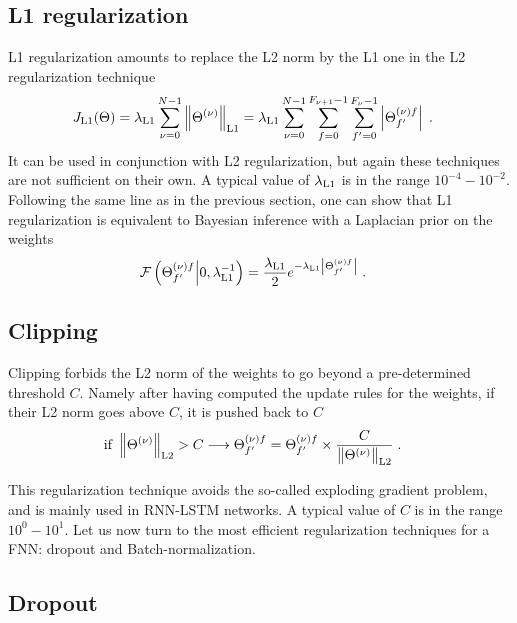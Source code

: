 \subsection{L1 regularization}

L1 regularization amounts to replace the L2 norm by the L1 one in the L2 regularization technique
\begin{align}
J_{{\rm L1}}(\Theta)&=\lambda_{{\rm L1}} \sum_{\nu=0}^{N-1}\left\|\Theta^{(\nu)}\right\|_{{\rm L1}}
%
=\lambda_{{\rm L1}}\sum_{\nu=0}^{N-1}\sum_{f=0}^{F_{\nu+1}-1}\sum_{f'=0}^{F_\nu-1}
%
\left|\Theta^{(\nu)f}_{f'}\right|\;.
\end{align}
It can be used in conjunction with L2 regularization, but again these techniques are not sufficient on their own. A typical value of $\lambda_{{\rm L1}}$ is in the range $10^{-4}-10^{-2}$. Following the same line as in the previous section, one can show that L1 regularization is equivalent to Bayesian inference with a Laplacian prior on the weights
\begin{align}
\mathcal{F}\left(\Theta^{(\nu)f}_{f'}\middle| 0,\lambda_{{\rm L1}}^{-1}\right)&=
%
\frac{\lambda_{{\rm L1}}}{2}e^{-\lambda_{{\rm L1}}\left|\Theta^{(\nu)f}_{f'}\right|}\;.
\end{align}

\subsection{Clipping}

Clipping forbids the L2 norm of the weights to go beyond a pre-determined threshold $C$. Namely after having computed the update rules for the weights, if their L2 norm goes above $C$, it is pushed back to $C$
\begin{align}
{\rm if}\;\left\|\Theta^{(\nu)}\right\|_{{\rm L2}}>C \longrightarrow \Theta^{(\nu)f}_{f'}&=
%
\Theta^{(\nu)f}_{f'} \times \frac{C}{\left\|\Theta^{(\nu)}\right\|_{{\rm L2}}}\;.
\end{align}

This regularization technique avoids the so-called exploding gradient problem, and is mainly used in RNN-LSTM networks. A typical value of $C$ is in the range $10^{0}-10^{1}$. Let us now turn to the most efficient regularization techniques for a FNN: dropout and Batch-normalization.


\subsection{Dropout}

